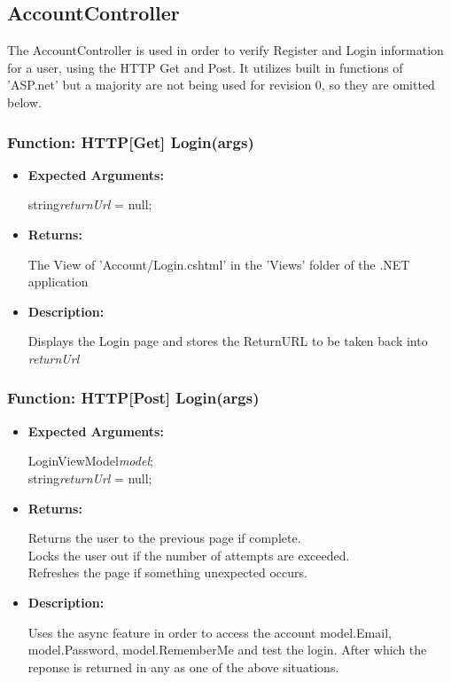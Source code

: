 \documentclass{scrreprt}
\begin{document}
\subsection{AccountController}
The AccountController is used in order to verify Register and Login information for a user, using the HTTP Get and Post. It utilizes built in functions of 'ASP.net' but a majority are not being used for revision 0, so they are omitted below.

\subsubsection{Function: HTTP[Get] Login(args)}
\begin{itemize}
    \item \textbf{Expected Arguments:}

    string\quad\textit{returnUrl} = null;

    \item \textbf{Returns:}

    The View of 'Account/Login.cshtml' in the 'Views' folder of the .NET application

    \item \textbf{Description:}

    Displays the Login page and stores the ReturnURL to be taken back into \textit{returnUrl}
\end{itemize}

\subsubsection{Function: HTTP[Post] Login(args)}
\begin{itemize}
    \item \textbf{Expected Arguments:}

    LoginViewModel\quad\textit{model};
    \\
    string\quad\textit{returnUrl} = null;

    \item \textbf{Returns:}

    Returns the user to the previous page if complete.
    \\
    Locks the user out if the number of attempts are exceeded.
    \\
    Refreshes the page if something unexpected occurs.

    \item \textbf{Description:}

    Uses the async feature in order to access the account model.Email, model.Password, model.RememberMe and test the login. After which the reponse is returned in any as one of the above situations.

\end{itemize}
\end{document}
